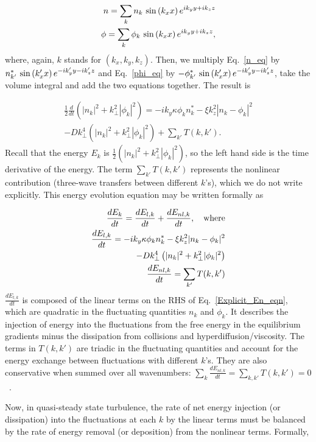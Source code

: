 \documentclass[twocolumn,showkeys,superscriptaddress]{revtex4}
\def\beqar{\begin{eqnarray}}
\def\eeqar{\end{eqnarray}}
\newcommand{\diff}[2]{\frac{d#1}{d#2}}
\begin{document}
\beqar
\label{subs_fourier_n}
n = \sum_{k} n_k \ {\rm sin} \left( k_x x \right) e^{i k_y y + i k_z z} \\
\label{subs_fourier_phi}
\phi = \sum_{k} \phi_k \ {\rm sin} \left( k_x x \right) e^{i k_y y + i k_z z},
\eeqar
where, again, $k$ stands for $(k_x,k_y,k_z)$.
Then, we multiply Eq.~\ref{n_eq} by $n^*_{k'} \ {\rm sin} \left( k'_x x \right) e^{-i k'_y y - i k'_z z}$ and Eq.~\ref{phi_eq} by 
$-\phi^*_{k'} \ {\rm sin} \left( k'_x x \right) e^{-i k'_y y - i k'_z z}$, take the volume integral and add the two equations together. The result is

\beqar
\label{Explicit_En_eqn}
\frac{1}{2} \diff{}{t} \left( |n_k|^2 + k^2_\perp |\phi_k|^2 \right) = -i k_y \kappa \phi_k n^*_k - \xi k_z^2 |n_k - \phi_k|^2 \nonumber \\
- D k^4_\perp \left( |n_k|^2 + k^2_\perp |\phi_k|^2 \right) + \sum_{k'} T(k,k'). \quad \quad
\eeqar
Recall that the energy $E_k$ is $\frac{1}{2} \left( |n_k|^2 + k^2_\perp |\phi_k|^2 \right)$, so the left hand side is the time derivative of the energy.
The term $\sum_{k'} T(k,k')$ represents the nonlinear contribution (three-wave transfers between different $k$'s), 
which we do not write explicitly. This energy evolution equation may be written formally as

\beqar
\label{dEdt_def}
\diff{E_k}{t} = \diff{E_{l,k}}{t} + \diff{E_{nl,k}}{t}, \quad {\rm where}\\
\label{dEl_dt_def}
\diff{E_{l,k}}{t} = -i k_y \kappa \phi_k n^*_k - \xi k_z^2 |n_k - \phi_k|^2 \nonumber \\
- D k^4_\perp \left( |n_k|^2 + k^2_\perp |\phi_k|^2 \right) \\
\label{dEnl_dt_def}
 \diff{E_{nl,k}}{t} = \sum_{k'} T(k,k')
\eeqar
$\diff{E_{l,k}}{t}$ is composed of the linear terms on the RHS of Eq.~\ref{Explicit_En_eqn}, which are quadratic in the fluctuating quantities $n_k$ and $\phi_k$.
It describes the injection of energy into the fluctuations from the free energy in the equilibrium gradients minus the dissipation from collisions and hyperdiffusion/viscosity.
The terms in $T(k,k')$ are triadic in the fluctuating quantities and account for the energy exchange between fluctuations with different $k$'s. 
They are also conservative when summed over all wavenumbers: $\sum_{k} \diff{E_{nl,k}}{t} = \sum_{k,k'} T(k,k') = 0$~\cite{camargo1995}.

Now, in quasi-steady state turbulence, the rate of net energy injection (or dissipation) into the fluctuations at each $k$ by the linear terms must be balanced by
the rate of energy removal (or deposition) from the nonlinear terms. Formally,
\end{document}
